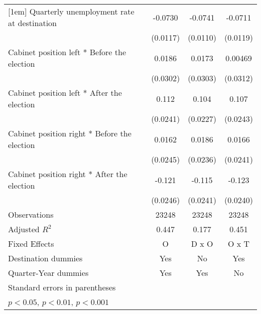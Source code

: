 \begin{table}[htbp]
\begin{tabular}{l*{3}{c}}
[1em]
Quarterly unemployment rate at destination&     -0.0730\sym{***}&     -0.0741\sym{***}&     -0.0711\sym{***}\\
                    &    (0.0117)         &    (0.0110)         &    (0.0119)         \\
[1em]
Cabinet position left * Before the election&      0.0186         &      0.0173         &     0.00469         \\
                    &    (0.0302)         &    (0.0303)         &    (0.0312)         \\
[1em]
Cabinet position left * After the election&       0.112\sym{***}&       0.104\sym{***}&       0.107\sym{***}\\
                    &    (0.0241)         &    (0.0227)         &    (0.0243)         \\
[1em]
Cabinet position right * Before the election&      0.0162         &      0.0186         &      0.0166         \\
                    &    (0.0245)         &    (0.0236)         &    (0.0241)         \\
[1em]
Cabinet position right * After the election&      -0.121\sym{***}&      -0.115\sym{***}&      -0.123\sym{***}\\
                    &    (0.0246)         &    (0.0241)         &    (0.0240)         \\
\hline
Observations        &       23248         &       23248         &       23248         \\
Adjusted \(R^{2}\)  &       0.447         &       0.177         &       0.451         \\
Fixed Effects       &           O         &       D x O         &       O x T         \\
Destination dummies &         Yes         &          No         &         Yes         \\
Quarter-Year dummies&         Yes         &         Yes         &          No         \\
\hline\hline
\multicolumn{4}{l}{\footnotesize Standard errors in parentheses}\\
\multicolumn{4}{l}{\footnotesize \sym{*} \(p<0.05\), \sym{**} \(p<0.01\), \sym{***} \(p<0.001\)}\\
\end{tabular}
\end{table}
